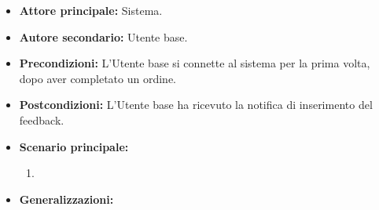 \label{usecase:Feedback automatico}
\begin{itemize}
	\item \textbf{Attore principale:} Sistema.

	\item \textbf{Autore secondario:} Utente base.

	\item \textbf{Precondizioni:}
	      L'Utente base si connette al sistema per la prima volta, dopo aver
	      completato un ordine.

	\item \textbf{Postcondizioni:}
	      L'Utente base ha ricevuto la notifica di inserimento del feedback.

	\item \textbf{Scenario principale:}
	      \begin{enumerate}
		      \item
	      \end{enumerate}

	\item \textbf{Generalizzazioni:}
	      \begin{itemize}
	      \end{itemize}
\end{itemize}
